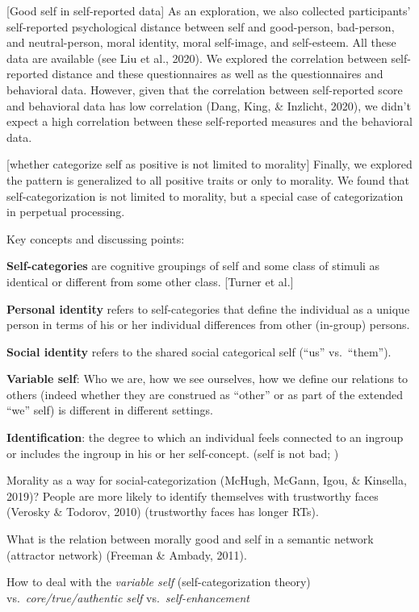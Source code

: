 \documentclass[
  english,
  man]{apa6}
\begin{document}
{[}Good self in self-reported data{]} As an exploration, we also collected participants' self-reported psychological distance between self and good-person, bad-person, and neutral-person, moral identity, moral self-image, and self-esteem. All these data are available (see Liu et al., 2020). We explored the correlation between self-reported distance and these questionnaires as well as the questionnaires and behavioral data. However, given that the correlation between self-reported score and behavioral data has low correlation (Dang, King, \& Inzlicht, 2020), we didn't expect a high correlation between these self-reported measures and the behavioral data.

{[}whether categorize self as positive is not limited to morality{]} Finally, we explored the pattern is generalized to all positive traits or only to morality. We found that self-categorization is not limited to morality, but a special case of categorization in perpetual processing.

Key concepts and discussing points:

\textbf{Self-categories} are cognitive groupings of self and some class of stimuli as identical or different from some other class. {[}Turner et al.{]}

\textbf{Personal identity} refers to self-categories that define the individual as a unique person in terms of his or her individual differences from other (in-group) persons.

\textbf{Social identity} refers to the shared social categorical self (\enquote{us} vs.~\enquote{them}).

\textbf{Variable self}: Who we are, how we see ourselves, how we define our relations to others (indeed whether they are construed as \enquote{other} or as part of the extended \enquote{we} self) is different in different settings.

\textbf{Identification}: the degree to which an individual feels connected to an ingroup or includes the ingroup in his or her self-concept. (self is not bad; )

Morality as a way for social-categorization (McHugh, McGann, Igou, \& Kinsella, 2019)? People are more likely to identify themselves with trustworthy faces (Verosky \& Todorov, 2010) (trustworthy faces has longer RTs).

What is the relation between morally good and self in a semantic network (attractor network) (Freeman \& Ambady, 2011).

How to deal with the \emph{variable self} (self-categorization theory) vs.~\emph{core/true/authentic self} vs.~\emph{self-enhancement}
\end{document}
